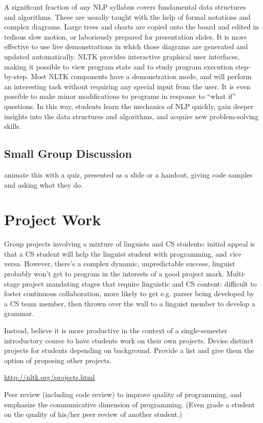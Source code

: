 \documentclass[11pt]{article}
\begin{document}
A significant fraction of any NLP syllabus covers fundamental data
structures and algorithms. These are usually taught with the help of
formal notations and complex diagrams. Large trees and charts are
copied onto the board and edited in tedious slow motion, or
laboriously prepared for presentation slides. It is more effective to
use live demonstrations in which those diagrams are generated and
updated automatically. NLTK provides interactive graphical user
interfaces, making it possible to view program state and to study
program execution step-by-step. Most NLTK components have a
demonstration mode, and will perform an interesting task without
requiring any special input from the user. It is even possible to make
minor modifications to programs in response to ``what if'' questions. In
this way, students learn the mechanics of NLP quickly, gain deeper
insights into the data structures and algorithms, and acquire new
problem-solving skills.

\subsection{Small Group Discussion}

animate this with a quiz, presented as a slide or a handout, giving code samples and asking what they do.

\section{Project Work}

Group projects involving a mixture of linguists and CS students:
initial appeal is that a CS student will help the linguist student with programming,
and vice versa.  However, there's a
complex dynamic, unpredictable success, linguist probably won't get to program
in the interests of a good project mark.
Multi-stage project mandating stages that require linguistic and CS content: difficult
to foster continuous collaboration, more likely to get e.g. parser being developed by
a CS team member, then thrown over the wall to a linguist member to develop a grammar.

Instead, believe it is more productive in the context of a single-semester introductory
course to have students work on their own projects.  Devise distinct projects for
students depending on background.  Provide a list and give them the option of proposing
other projects.

\url{http://nltk.org/projects.html}

Peer review (including code review) to improve quality of programming, and
emphasize the communicative dimension of programming.
(Even grade a student on the quality of his/her peer review of another student.)







\end{document}
